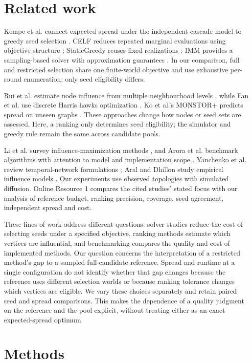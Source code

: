 \documentclass[smallextended]{svjour3}
\begin{document}
\section{Related work}
Kempe et al. connect expected spread under the independent-cascade model to greedy seed selection \cite{ref1}. CELF reduces repeated marginal evaluations using objective structure \cite{ref7}; StaticGreedy reuses fixed realizations \cite{ref8}; IMM provides a sampling-based solver with approximation guarantees \cite{ref2}. In our comparison, full and restricted selection share one finite-world objective and use exhaustive per-round enumeration; only seed eligibility differs.

Rui et al. estimate node influence from multiple neighbourhood levels \cite{ref12}, while Fan et al. use discrete Harris hawks optimization \cite{ref13}. Ko et al.'s MONSTOR+ predicts spread on unseen graphs \cite{ref19}. These approaches change how nodes or seed sets are assessed. Here, a ranking only determines seed eligibility; the simulator and greedy rule remain the same across candidate pools.

Li et al. survey influence-maximization methods \cite{ref9}, and Arora et al. benchmark algorithms with attention to model and implementation scope \cite{ref16}. Yanchenko et al. review temporal-network formulations \cite{ref11}; Aral and Dhillon study empirical influence models \cite{ref15}. Our experiments use observed topologies with simulated diffusion. Online Resource 1 compares the cited studies' stated focus with our analysis of reference budget, ranking precision, coverage, seed agreement, independent spread and cost.

These lines of work address different questions: solver studies reduce the cost of selecting seeds under a specified objective, ranking methods estimate which vertices are influential, and benchmarking compares the quality and cost of implemented methods. Our question concerns the interpretation of a restricted method's gap to a sampled full-candidate reference. Spread and runtime at a single configuration do not identify whether that gap changes because the reference uses different selection worlds or because ranking tolerance changes which vertices are eligible. We vary these choices separately and retain paired seed and spread comparisons. This makes the dependence of a quality judgment on the reference and the pool explicit, without treating either as an exact expected-spread optimum.

\section{Methods}
\end{document}
